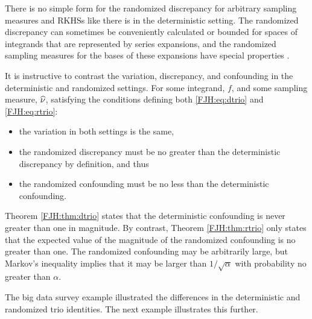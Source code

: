 \documentclass[graybox,footinfo]{svmult}
\begin{document}
There is no simple form for the randomized discrepancy for arbitrary sampling measures 
and RKHSs like there is in the deterministic setting.  The 
randomized discrepancy can sometimes be conveniently calculated or bounded for 
spaces of integrands that are represented by series expansions, and the randomized 
sampling measures for the bases of these expansions have special properties 
\cite{HeiHicYue02a, HicWoz00a}.

It is instructive to contrast the variation, discrepancy, and confounding in the 
deterministic and randomized settings.   For some integrand, $f$, and some sampling 
measure, $\widehat{\nu}$, satisfying the 
conditions defining both \eqref{FJH:eq:dtrio}  and \eqref{FJH:eq:rtrio}:
\begin{itemize}
	\item the variation in both settings is the same,
	
	\item the randomized discrepancy 
	must be no greater than the deterministic discrepancy by definition, and thus
	
	\item the randomized confounding must be no less than the deterministic 
	confounding.  
\end{itemize}
Theorem \ref{FJH:thm:dtrio} states that the deterministic confounding is never greater 
than one in magnitude.  By contrast, Theorem \ref{FJH:thm:rtrio} 
only states that the expected value of the magnitude of the randomized confounding is 
no greater than one.  The randomized confounding may be arbitrarily large, but Markov's 
inequality implies that it may be larger than $1/\sqrt{\alpha}$ with  probability no greater 
than $\alpha$.  

The big data survey example illustrated the differences in the 
deterministic and randomized trio identities.  The next example illustrates this further.
\end{document}
